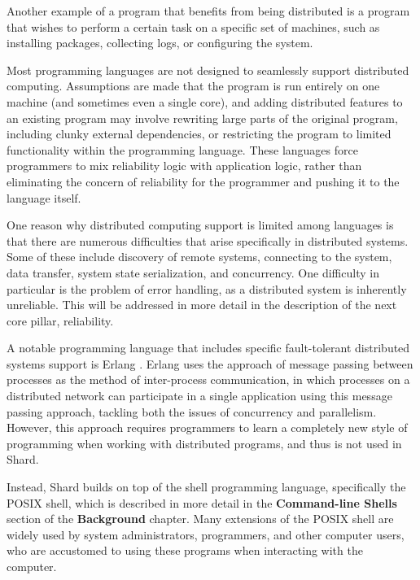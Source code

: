 \documentclass[oneside]{report}
\newcommand{\todoi}[1]{\todo[inline, color=blue!20]{TODO: {#1}}}
\begin{document}
Another example of a program that benefits from being distributed is a program that wishes to perform a certain task on a specific set of machines, such as installing packages, collecting logs, or configuring the system.

Most programming languages are not designed to seamlessly support distributed computing.
Assumptions are made that the program is run entirely on one machine (and sometimes even a single core), and adding distributed features to an existing program may involve rewriting large parts of the original program, including clunky external dependencies, or restricting the program to limited functionality within the programming language.
These languages force programmers to mix reliability logic with application logic, rather than eliminating the concern of reliability for the programmer and pushing it to the language itself.

One reason why distributed computing support is limited among languages is that there are numerous difficulties that arise specifically in distributed systems. Some of these include discovery of remote systems, connecting to the system, data transfer, system state serialization, and concurrency.
One difficulty in particular is the problem of error handling, as a distributed system is inherently unreliable. This will be addressed in more detail in the description of the next core pillar, reliability.

A notable programming language that includes specific fault-tolerant distributed systems support is Erlang \cite{armstrong2010erlang}. Erlang uses the approach of message passing between processes as the method of inter-process communication, in which processes on a distributed network can participate in a single application using this message passing approach, tackling both the issues of concurrency and parallelism.
However, this approach requires programmers to learn a completely new style of programming when working with distributed programs, and thus is not used in Shard.


Instead, Shard builds on top of the shell programming language, specifically the POSIX shell, which is described in more detail in the \textbf{Command-line Shells} section of the \textbf{Background} chapter. Many extensions of the POSIX shell are widely used by system administrators, programmers, and other computer users, who are accustomed to using these programs when interacting with the computer.
\end{document}

